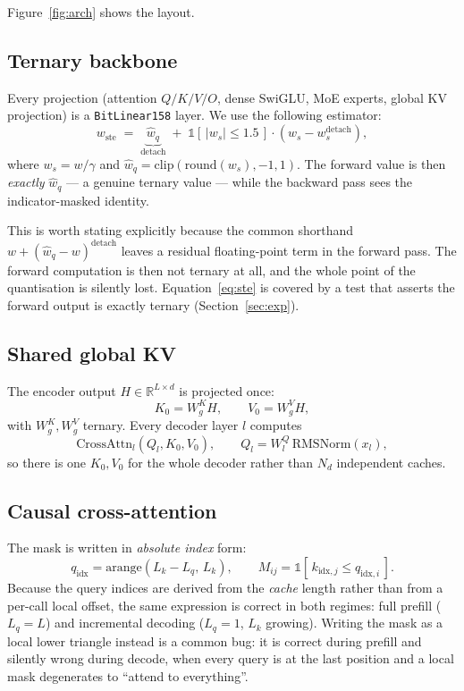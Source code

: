 \documentclass[10pt,conference]{IEEEtran}
\newcommand{\code}[1]{\texttt{\small #1}}
\begin{document}
Figure~\ref{fig:arch} shows the layout.

\subsection{Ternary backbone}

Every projection (attention $Q/K/V/O$, dense SwiGLU, MoE experts, global KV
projection) is a \code{BitLinear158} layer. We use the following estimator:
\begin{equation}
w_{\text{ste}} \;=\; \underbrace{\hat{w}_q}_{\text{detach}} \;+\;
\mathbb{1}\!\left[\,|w_s| \le 1.5 \,\right] \cdot \left( w_s - w_s^{\text{detach}} \right),
\label{eq:ste}
\end{equation}
where $w_s = w/\gamma$ and $\hat{w}_q = \mathrm{clip}(\mathrm{round}(w_s),-1,1)$.
The forward value is then \emph{exactly} $\hat{w}_q$ --- a genuine ternary
value --- while the backward pass sees the indicator-masked identity.

This is worth stating explicitly because the common shorthand
$w + (\hat{w}_q - w)^{\text{detach}}$ leaves a residual floating-point term in the
forward pass. The forward computation is then not ternary at all, and the whole point
of the quantisation is silently lost. Equation~\ref{eq:ste} is covered by a test that
asserts the forward output is exactly ternary (Section~\ref{sec:exp}).

\subsection{Shared global KV}

The encoder output $H \in \mathbb{R}^{L \times d}$ is projected once:
\begin{equation}
K_0 = W^K_g H, \qquad V_0 = W^V_g H,
\end{equation}
with $W^K_g, W^V_g$ ternary. Every decoder layer $l$ computes
\begin{equation}
\text{CrossAttn}_l(Q_l, K_0, V_0), \qquad
Q_l = W^Q_l \, \mathrm{RMSNorm}(x_l),
\end{equation}
so there is one $K_0,V_0$ for the whole decoder rather than $N_d$ independent caches.

\subsection{Causal cross-attention}

The mask is written in \emph{absolute index} form:
\begin{equation}
q_{\text{idx}} = \mathrm{arange}(L_k - L_q,\, L_k), \qquad
M_{ij} = \mathbb{1}[\, k_{\text{idx},j} \le q_{\text{idx},i} \,].
\label{eq:mask}
\end{equation}
Because the query indices are derived from the \emph{cache} length rather than from a
per-call local offset, the same expression is correct in both regimes: full prefill
($L_q = L$) and incremental decoding ($L_q = 1$, $L_k$ growing). Writing the mask as a
local lower triangle instead is a common bug: it is correct during prefill and silently
wrong during decode, when every query is at the last position and a local mask
degenerates to ``attend to everything''.
\end{document}
